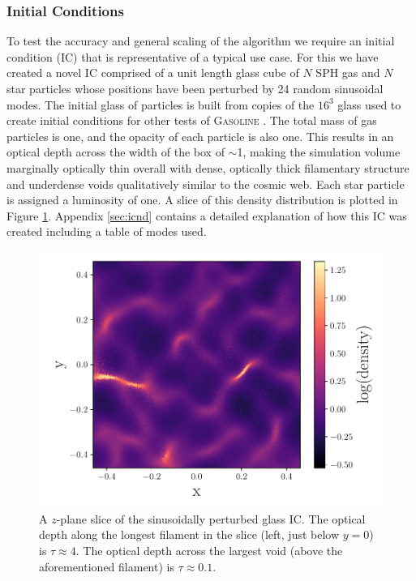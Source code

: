 \documentclass[fleq,usenatbib]{mnras}
\begin{document}
{\subsubsection{Initial Conditions}
To test the accuracy and general scaling of the algorithm we require an 
initial condition (IC) that is representative of a typical use case. For this 
we have created a novel IC comprised of a unit length glass cube of $N$ SPH gas and 
$N$ star particles whose positions have been perturbed by 24 random sinusoidal 
modes. The initial glass of particles is built from copies of the $16^3$ glass 
used to create initial conditions for other tests of \textsc{Gasoline} 
\citep{wadsleyEt17}. The total mass of gas particles is one, and the opacity 
of each particle is also one. This results in an optical depth across the 
width of the box of $\sim$1, making the simulation volume marginally  optically thin 
overall with dense, optically thick filamentary structure and underdense voids 
qualitatively similar to the cosmic web. Each star particle is assigned a 
luminosity of one. A slice of this density distribution is plotted in Figure 
\ref{fig:sine_rho}. Appendix \ref{sec:icnd} contains a detailed explanation of 
how this IC was created including a table of modes used.
\begin{figure}
\includegraphics[width=1\linewidth]{Figures/sine_rho.pdf}
\caption{A $z$-plane slice of the sinusoidally perturbed glass IC. The optical 
depth along the longest filament in the slice (left, just below $y=0$) is
$\tau\approx 4$. The optical depth across the largest void (above the 
aforementioned filament) is $\tau\approx 0.1$.}
\label{fig:sine_rho}
\end{figure}

}
\end{document}
